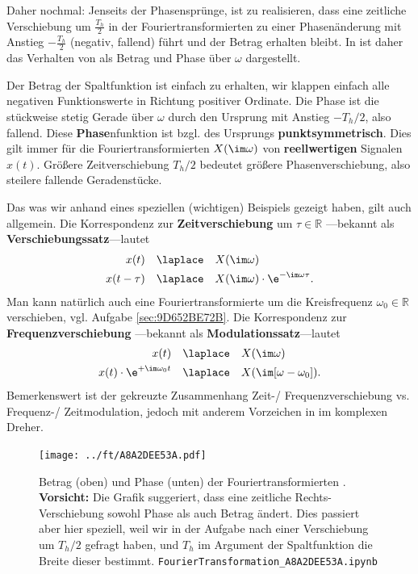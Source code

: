 \begin{Loesung}
Daher nochmal: Jenseits der Phasensprünge, ist zu realisieren, dass
eine zeitliche Verschiebung um $\frac{T_h}{2}$ in der Fouriertransformierten
zu einer Phasenänderung mit Anstieg $-\frac{T_h}{2}$ (negativ, fallend)
führt und der Betrag erhalten bleibt.
%
In  ist daher das Verhalten von  als
Betrag und Phase über $\omega$ dargestellt.

Der Betrag der Spaltfunktion ist einfach zu erhalten, wir klappen einfach alle
negativen Funktionswerte in Richtung positiver Ordinate.
%
Die Phase ist die stückweise stetig Gerade über $\omega$ durch den Ursprung
mit Anstieg $-T_h/2$, also fallend.
%
Diese \textbf{Phase}nfunktion ist bzgl. des Ursprungs \textbf{punktsymmetrisch}.
Dies gilt immer für die Fouriertransformierten $X(\im\omega)$ von \textbf{reellwertigen}
Signalen $x(t)$.
%
Größere Zeitverschiebung $T_h/2$ bedeutet größere Phasenverschiebung, also steilere
fallende Geradenstücke.

Das was wir anhand eines speziellen (wichtigen) Beispiels gezeigt haben, gilt auch
allgemein. Die Korrespondenz zur \textbf{Zeitverschiebung} um $\tau\in\mathbb{R}$
---bekannt als \textbf{Verschiebungssatz}---lautet
\begin{align}
x(t) & \quad \laplace \quad X(\im\omega)\\
x(t - \tau) & \quad \laplace \quad X(\im\omega) \cdot \e^{-\im\omega \tau}.
\end{align}
%
Man kann natürlich auch eine Fouriertransformierte um die Kreisfrequenz
$\omega_0\in\mathbb{R}$ verschieben, vgl. Aufgabe \ref{sec:9D652BE72B}.
%
Die Korrespondenz zur \textbf{Frequenzverschiebung}
---bekannt als \textbf{Modulationssatz}---lautet
\begin{align}
x(t) & \quad \laplace \quad X(\im\omega)\\
\label{eq:A8A2DEE53A_ModTheoremTime}
x(t) \cdot \e^{+\im\omega_0 t} & \quad \laplace \quad X(\im[\omega-\omega_0]).
\end{align}
%
Bemerkenswert ist der gekreuzte Zusammenhang Zeit-/ Frequenzverschiebung
vs.
Frequenz-/ Zeitmodulation,
jedoch mit anderem Vorzeichen
in im komplexen Dreher.
\end{Loesung}

\begin{figure}[h!]
\texttt{[image: ../ft/A8A2DEE53A.pdf]}
  \caption{Betrag (oben) und Phase (unten) der Fouriertransformierten .
\textbf{Vorsicht:} Die Grafik suggeriert, dass eine zeitliche Rechts-Verschiebung
sowohl Phase als auch Betrag ändert. Dies passiert aber hier speziell, weil wir in der
Aufgabe nach einer Verschiebung um $T_h/2$ gefragt haben, und $T_h$
im Argument der Spaltfunktion die Breite dieser bestimmt.
\texttt{FourierTransformation\_A8A2DEE53A.ipynb}}
  \label{fig:A8A2DEE53A}
\end{figure}


